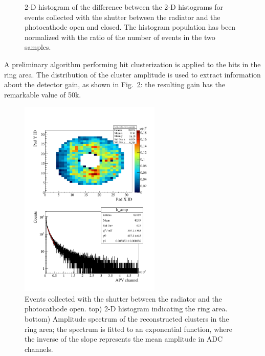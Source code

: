 \begin{enumerate}
\begin{figure}
\begin{center}
				\caption{\label{fig:subtraction_open_close_Ar_CH4_2D-2}
              2-D histogram of the difference between the 2-D histograms for events collected with the shutter between the radiator and the photocathode open and closed. The histogram population has been normalized with the ratio of the number of events in the two samples. }
			\end{center}
            \end{figure} 
     A preliminary algorithm performing hit clusterization is applied to the hits in the ring area. The distribution of the cluster amplitude is used to extract information about the detector gain, as shown in Fig.~\ref{fig:cluster_gain_fit}: the resulting gain has the remarkable value of 50k. %
\begin{figure}
			\begin{center}
			\includegraphics[width=0.6\textwidth]
                			{INFN_plots/cluster_gain_fit}
				\caption{\label{fig:cluster_gain_fit}
               Events collected with the shutter between the radiator and the photocathode open. top) 2-D histogram indicating the ring area. bottom) Amplitude spectrum of the reconstructed clusters in the ring area; the spectrum is fitted to an exponential function, where the inverse of the slope represents the mean amplitude in ADC channels. }
			\end{center}
            \end{figure} 

\end{enumerate}
